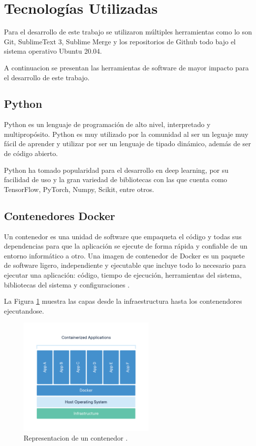 \section{Tecnologías Utilizadas}

Para el desarrollo de este trabajo se utilizaron múltiples herramientas como lo son Git, SublimeText 3, Sublime Merge y los repositorios de Github todo bajo el sistema operativo Ubuntu 20.04.

A continuacion se presentan las herramientas de software de mayor impacto para el desarrollo de este trabajo.

\subsection{Python}

Python es un lenguaje de programación de alto nivel, interpretado y multipropósito. Python es muy utilizado por  la comunidad al ser un leguaje muy fácil de aprender y utilizar por ser un lenguaje de tipado dinámico, además de ser de código abierto.

Python ha tomado popularidad para el desarrollo en deep learning, por su facilidad de uso y la gran variedad de bibliotecas con las que cuenta como TensorFlow, PyTorch, Numpy, Scikit, entre otros.

\subsection{Contenedores Docker}

Un contenedor es una unidad de software que empaqueta el código y todas sus dependencias para que la aplicación se ejecute de forma rápida y confiable de un entorno informático a otro. Una imagen de contenedor de Docker es un paquete de software ligero, independiente y ejecutable que incluye todo lo necesario para ejecutar una aplicación: código, tiempo de ejecución, herramientas del sistema, bibliotecas del sistema y configuraciones \cite{docker2021container}.

La Figura \ref{fig:contenedorDocker} muestra las capas desde la infraestructura hasta los contenendores ejecutandose.

\begin{figure}[H]
    \centering
    \includegraphics[width=0.6\textwidth]{MarcoTeorico/imgs/container-what-is-container.png}
    \caption{Representacion de un contenedor \cite{docker2021container}.}
    \label{fig:contenedorDocker}
\end{figure}


